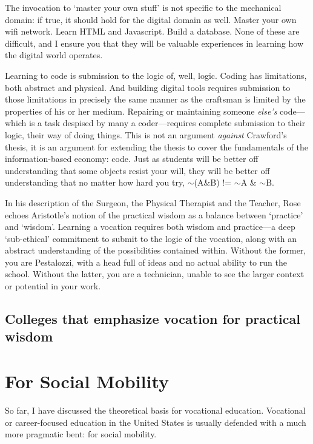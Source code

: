 The invocation to `master your own stuff' is not specific to the mechanical domain: if true, it should hold for the digital domain as well. Master your own wifi network. Learn HTML and Javascript. Build a database. None of these are difficult, and I ensure you that they will be valuable experiences in learning how the digital world operates.

Learning to code is submission to the logic of, well, logic. Coding has limitations, both abstract and physical. And building digital tools requires submission to those limitations in precisely the same manner as the craftsman is limited by the properties of his or her medium. Repairing or maintaining someone \emph{else's} code---which is a task despised by many a coder---requires complete submission to their logic, their way of doing things. This is not an argument \emph{against} Crawford's thesis, it is an argument for extending the thesis to cover the fundamentals of the information-based economy: code. Just as students will be better off understanding that some objects resist your will, they will be better off understanding that no matter how hard you try, \ensuremath{\sim}(A\&B) != \ensuremath{\sim}A \& \ensuremath{\sim}B.

In his description of the Surgeon, the Physical Therapist and the Teacher, Rose echoes Aristotle's notion of the practical wisdom as a balance between `practice' and `wisdom'. Learning a vocation requires both wisdom and practice---a deep `sub-ethical' commitment to submit to the logic of the vocation, along with an abstract understanding of the possibilities contained within. Without the former, you are Pestalozzi, with a head full of ideas and no actual ability to run the school. Without the latter, you are a technician, unable to see the larger context or potential in your work.

\subsection{Colleges that emphasize vocation for practical wisdom}
\label{collegesthatemphasizevocationforpracticalwisdom}

\section{For Social Mobility}
\label{forsocialmobility}

So far, I have discussed the theoretical basis for vocational education. Vocational or career-focused education in the United States is usually defended with a much more pragmatic bent: for social mobility.


